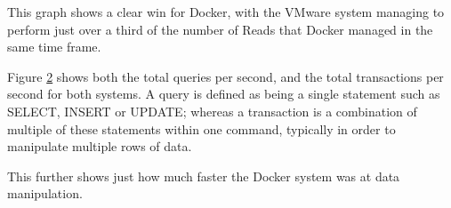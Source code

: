 This graph shows a clear win for Docker, with the VMware system managing to perform just over a third of the number of Reads that Docker managed in the same time frame.

\begin{figure}[H]
\caption{}
\label{fig:test2fiveminutes}
\centering
\end{figure}

Figure \ref{fig:test2onesecgraph} shows both the total queries per second, and the total transactions per second for both systems. A query is defined as being a single statement such as SELECT, INSERT or UPDATE\citep{mysqlqueries}; whereas a transaction is a combination of multiple of these statements within one command\citep{mysqltransactions}, typically in order to manipulate multiple rows of data.

This further shows just how much faster the Docker system was at data manipulation.

\begin{figure}[H]
\caption{}
\label{fig:test2onesecgraph}
\centering
\end{figure}


